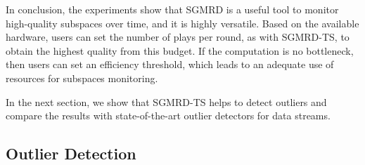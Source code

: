 In conclusion, the experiments show that \gls{SGMRD} is a useful tool to monitor high-quality subspaces over time, and it is highly versatile. Based on the available hardware, users can set the number of plays per round, as with \textsc{\gls{SGMRD}-\gls{TS}}, to obtain the highest quality from this budget. If the computation is no bottleneck, then users can set an efficiency threshold, which leads to an adequate use of resources for subspaces monitoring.     

In the next section, we show that \textsc{\gls{SGMRD}-\gls{TS}} helps to detect outliers and compare the results with state-of-the-art outlier detectors for data streams.  

\subsection{Outlier Detection}

